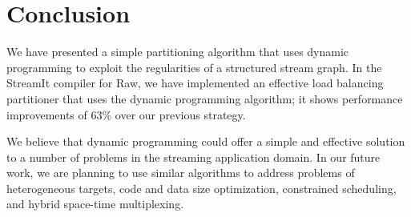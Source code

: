 \section{Conclusion}

We have presented a simple partitioning algorithm that uses dynamic
programming to exploit the regularities of a structured stream graph.
In the StreamIt compiler for Raw, we have implemented an effective
load balancing partitioner that uses the dynamic programming
algorithm; it shows performance improvements of 63\% over our previous
strategy.

We believe that dynamic programming could offer a simple and effective
solution to a number of problems in the streaming application domain.
In our future work, we are planning to use similar algorithms to
address problems of heterogeneous targets, code and data size
optimization, constrained scheduling, and hybrid space-time
multiplexing.
